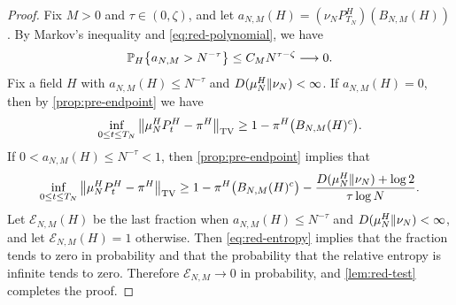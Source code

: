 \begin{proof}
Fix $M>0$ and $\tau\in(0,\zeta)$, and let $a_{N,M}(H)=(\nu_NP^H_{T_N})(B_{N,M}(H))$. By Markov's inequality and \eqref{eq:red-polynomial}, we have
\begin{equation*}
\mathbb P_H\bigl\{a_{N,M}>N^{-\tau}\bigr\}\le C_MN^{\tau-\zeta}\longrightarrow0.
\end{equation*}
Fix a field $H$ with $a_{N,M}(H)\le N^{-\tau}$ and $D(\mu^H_N\Vert\nu_N)<\infty$. If $a_{N,M}(H)=0$, then by \cref{prop:pre-endpoint} we have
\begin{equation*}
\inf_{0\le t\le T_N}\left\lVert\mu^H_NP^H_t-\pi^H\right\rVert_{\mathrm{TV}}\ge1-\pi^H\bigl(B_{N,M}(H)^c\bigr).
\end{equation*}
If $0<a_{N,M}(H)\le N^{-\tau}<1$, then \cref{prop:pre-endpoint} implies that
\begin{equation*}
\inf_{0\le t\le T_N}\left\lVert\mu^H_NP^H_t-\pi^H\right\rVert_{\mathrm{TV}}\ge1-\pi^H\bigl(B_{N,M}(H)^c\bigr)-\frac{D(\mu^H_N\Vert\nu_N)+\log2}{\tau\log N}.
\end{equation*}
Let $\mathcal E_{N,M}(H)$ be the last fraction when $a_{N,M}(H)\le N^{-\tau}$ and $D(\mu^H_N\Vert\nu_N)<\infty$, and let $\mathcal E_{N,M}(H)=1$ otherwise. Then \eqref{eq:red-entropy} implies that the fraction tends to zero in probability and that the probability that the relative entropy is infinite tends to zero. Therefore $\mathcal E_{N,M}\to0$ in probability, and \cref{lem:red-test} completes the proof.
\end{proof}
